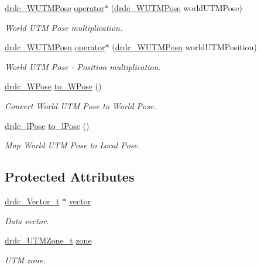 \begin{CompactItemize}
\hyperlink{classdrdc__WUTMPose}{drdc\_\-WUTMPose} \hyperlink{classdrdc__WUTMPose_d7fc2a0ccbee0f9042f0f5202deb7186}{operator$\ast$} (\hyperlink{classdrdc__WUTMPose}{drdc\_\-WUTMPose} worldUTMPose)
\begin{CompactList}\small\item\em World UTM Pose multiplication. \item\end{CompactList}\item 
\hyperlink{classdrdc__WUTMPosn}{drdc\_\-WUTMPosn} \hyperlink{classdrdc__WUTMPose_0e17522a504ad33eed8c6bb42ae2cac3}{operator$\ast$} (\hyperlink{classdrdc__WUTMPosn}{drdc\_\-WUTMPosn} worldUTMPosition)
\begin{CompactList}\small\item\em World UTM Pose - Position multiplication. \item\end{CompactList}\item 
\hyperlink{classdrdc__WPose}{drdc\_\-WPose} \hyperlink{classdrdc__WUTMPose_16b86001c3ee0e7b22cffcfdda270e06}{to\_\-WPose} ()
\begin{CompactList}\small\item\em Convert World UTM Pose to World Pose. \item\end{CompactList}\item 
\hyperlink{classdrdc__lPose}{drdc\_\-lPose} \hyperlink{classdrdc__WUTMPose_9fe6b8c960457e26367848e82a00a37e}{to\_\-lPose} ()
\begin{CompactList}\small\item\em Map World UTM Pose to Local Pose. \item\end{CompactList}\end{CompactItemize}
\subsection*{Protected Attributes}
\begin{CompactItemize}
\item 
\hyperlink{structdrdc__Vector__t}{drdc\_\-Vector\_\-t} $\ast$ \hyperlink{classdrdc__WUTMPose_8dc6dad1cd2224fc414137fb4665cd5d}{vector}
\begin{CompactList}\small\item\em Data vector. \item\end{CompactList}\item 
\hyperlink{structdrdc__UTMZone__t}{drdc\_\-UTMZone\_\-t} \hyperlink{classdrdc__WUTMPose_4596093fb33fafbb1257e54ff17bd13e}{zone}
\begin{CompactList}\small\item\em UTM zone. \item\end{CompactList}\end{CompactItemize}


